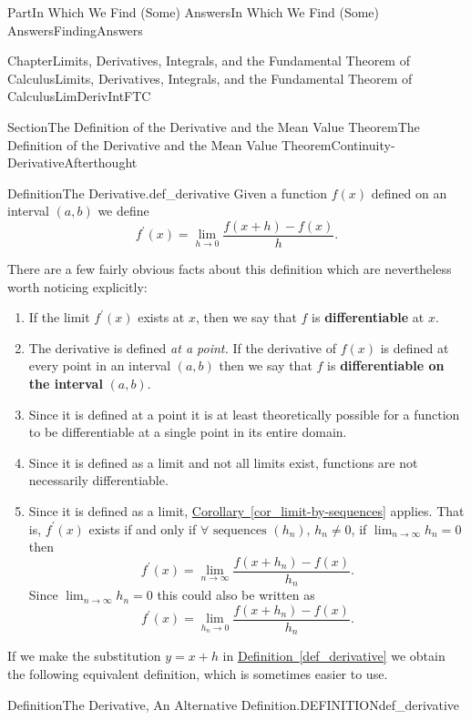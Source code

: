 \documentclass[oneside,10pt,]{book}
\newcommand{\xreffont}{\relax}
\newcommand{\terminology}[1]{\textbf{#1}}
\numberwithin{equation}{part}
\def\limit#1#2#3{{\displaystyle\lim_{#1\rightarrow #2}#3}}
\begin{document}
\begin{partptx}{Part}{In Which We Find (Some) Answers}{}{In Which We Find (Some) Answers}{}{}{FindingAnswers}
\begin{chapterptx}{Chapter}{Limits, Derivatives, Integrals, and the Fundamental Theorem of Calculus}{}{Limits, Derivatives, Integrals, and the Fundamental Theorem of Calculus}{}{}{LimDerivIntFTC}
\begin{sectionptx}{Section}{The Definition of  the Derivative and the Mean Value Theorem}{}{The Definition of  the Derivative and the Mean Value Theorem}{}{}{Continuity-DerivativeAfterthought}
\begin{definition}{Definition}{The Derivative.}{def_derivative}%
%
%
Given a function \(f(x)\) defined on an interval \((a,b)\) we define%
\begin{equation*}
f^\prime(x) =
\limit{h}{0}{\frac{f(x+h)-f(x)}{h}}.{} 
\end{equation*}
%
\end{definition}
There are a few fairly obvious facts about this definition which are nevertheless worth noticing explicitly:%
\par
%
\begin{enumerate}
\item{}If the limit \(f^\prime (x)\) exists at \(x\), then we say that \(f\) is \terminology{differentiable} at \(x\).%
\item{}The derivative is defined \emph{at a point.} If the derivative of \(f(x)\)  is defined at every point in an interval \((a,b)\) then we say that \(f\) is \terminology{differentiable on the interval} \((a,b)\).%
\item{}Since it is defined at a point it is at least theoretically possible for a function to be differentiable at a single point in its entire domain.%
\item{}Since it is defined as a limit and not all limits exist, functions are not necessarily differentiable.%
\item{}Since it is defined as a limit, \hyperref[cor_limit-by-sequences]{Corollary~{\xreffont\ref{cor_limit-by-sequences}}} applies.  That is, \(f^\prime(x)\) exists if and only if \(\forall \text{ sequences } (h_n),\, h_n\ne
0\), if \(\limit{n}{\infty}{h_n}=0\) then%
\begin{equation*}
f^\prime{(x)} =
\limit{n}{\infty}{\frac{f(x+h_n)-f(x)}{h_n}} \text{.}
\end{equation*}
Since \(\limit{n}{\infty}{h_n}=0\) this could also be written as%
\begin{equation*}
f^\prime{(x)} =
\limit{h_n}{0}{\frac{f(x+h_n)-f(x)}{h_n}}\text{.}
\end{equation*}
%
\end{enumerate}
%
\par
If we make the substitution \(y=x+h\) in \hyperref[def_derivative]{Definition~{\xreffont\ref{def_derivative}}}  we obtain the following equivalent definition, which is sometimes easier to use.%
\begin{definition}{Definition}{The Derivative, An Alternative Definition.}{DEFINITIONdef_derivative}%

\end{definition}
\end{sectionptx}
\end{chapterptx}
\end{partptx}
\end{document}
